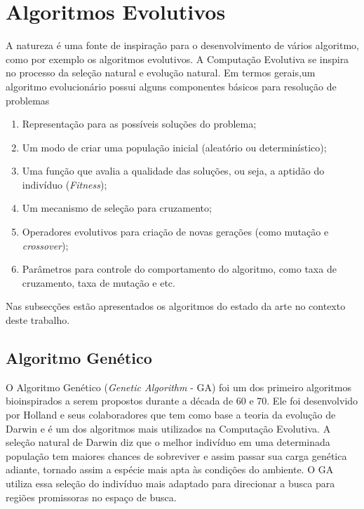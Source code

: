 \section{Algoritmos Evolutivos}
\label{sec:evolutionary_algorithms}
A natureza é uma fonte de inspiração para o desenvolvimento de vários algoritmo, como por exemplo os algoritmos evolutivos. A Computação Evolutiva se inspira no processo da seleção natural e evolução natural. 
Em termos gerais,um algoritmo evolucionário possui alguns componentes básicos para resolução de problemas \cite{parpinelli2011new}

\begin{enumerate}
\item Representação para as possíveis soluções do problema;
\item Um modo de criar uma população inicial (aleatório ou determinístico);
\item Uma função que avalia a qualidade das soluções, ou seja, a aptidão do indivíduo (\textit{Fitness});
\item Um mecanismo de seleção para cruzamento;
\item Operadores evolutivos para criação de novas gerações (como mutação e \textit{crossover});
\item Parâmetros para controle do comportamento do algoritmo, como taxa de cruzamento, taxa de mutação e etc.  
\end{enumerate}

Nas subsecções estão apresentados os algoritmos do estado da arte no contexto deste trabalho.

\subsection{Algoritmo Genético}
\label{sec:genetic_algorithms}
O Algoritmo Genético (\textit{Genetic Algorithm} - GA) foi um dos primeiro algoritmos bioinspirados a serem propostos durante a década de 60 e 70. Ele foi desenvolvido por Holland e seus colaboradores que tem como base a teoria da evolução de Darwin \cite{ga} e é um dos algoritmos mais utilizados na Computação Evolutiva. A seleção natural de Darwin diz que o melhor indivíduo em uma determinada população tem maiores chances de sobreviver e assim passar sua carga genética adiante, tornado assim a espécie mais apta às condições do ambiente. O GA utiliza essa seleção do indivíduo mais adaptado para direcionar a busca para regiões promissoras no espaço de busca.


